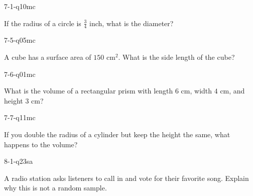 \begin{practiceQuestion}{7-1-q10}{mc}
\begin{questionText}
If the radius of a circle is $\frac{3}{4}$ inch, what is the diameter?
\end{questionText}
\end{practiceQuestion}

\begin{practiceQuestion}{7-5-q05}{mc}
\begin{questionText}
A cube has a surface area of $150$ cm$^2$. What is the side length of the cube?
\end{questionText}
\end{practiceQuestion}

\begin{practiceQuestion}{7-6-q01}{mc}
\begin{questionText}
What is the volume of a rectangular prism with length $6$ cm, width $4$ cm, and height $3$ cm?
\end{questionText}
\end{practiceQuestion}

\begin{practiceQuestion}{7-7-q11}{mc}
\begin{questionText}
If you double the radius of a cylinder but keep the height the same, what happens to the volume?
\end{questionText}
\end{practiceQuestion}

\begin{practiceQuestion}{8-1-q23}{sa}
\begin{questionText}
A radio station asks listeners to call in and vote for their favorite song. Explain why this is not a random sample.
\end{questionText}
\end{practiceQuestion}

